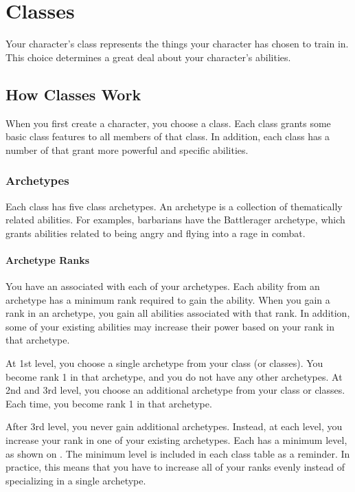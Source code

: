 \chapter{Classes}\label{Classes}

Your character's class represents the things your character has chosen to train in.
This choice determines a great deal about your character's abilities.

\section{How Classes Work}
    When you first create a character, you choose a class.
    Each class grants some basic class features to all members of that class.
    In addition, each class has a number of  that grant more powerful and specific abilities.

    \subsection{Archetypes}\label{Archetypes}
        Each class has five class archetypes.
        An archetype is a collection of thematically related abilities.
        For examples, barbarians have the Battlerager archetype, which grants abilities related to being angry and flying into a rage in combat.

        \subsubsection{Archetype Ranks}\label{Archetype Ranks}
            You have an  associated with each of your archetypes.
            Each ability from an archetype has a minimum rank required to gain the ability.
            When you gain a rank in an archetype, you gain all abilities associated with that rank.
            In addition, some of your existing abilities may increase their power based on your rank in that archetype.

            At 1st level, you choose a single archetype from your class (or classes).
            You become rank 1 in that archetype, and you do not have any other archetypes.
            At 2nd and 3rd level, you choose an additional archetype from your class or classes.
            Each time, you become rank 1 in that archetype.

            After 3rd level, you never gain additional archetypes.
            Instead, at each level, you increase your rank in one of your existing archetypes.
            Each  has a minimum level, as shown on .
            The minimum level is included in each class table as a reminder.
            In practice, this means that you have to increase all of your ranks evenly instead of specializing in a single archetype.

